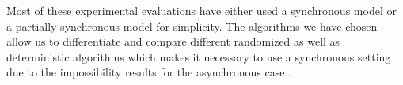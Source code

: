 Most of these experimental evaluations have either used a synchronous model or
a partially synchronous model for simplicity. The algorithms we have chosen
allow us to differentiate and compare different randomized as well as
deterministic algorithms which makes it necessary to use a synchronous setting
due to the impossibility results for the asynchronous case \cite{FischerLP83}. 



